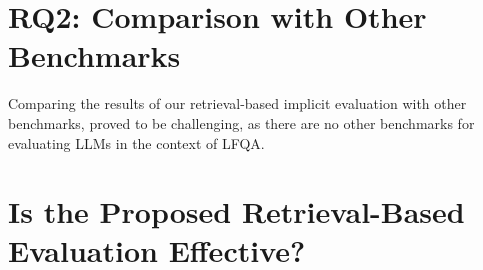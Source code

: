 \section{RQ2: Comparison with Other Benchmarks}
Comparing the results of our retrieval-based implicit evaluation with other benchmarks, proved to be challenging, as there are no other benchmarks for evaluating LLMs in the context of LFQA.



\section{Is the Proposed Retrieval-Based Evaluation Effective?}


